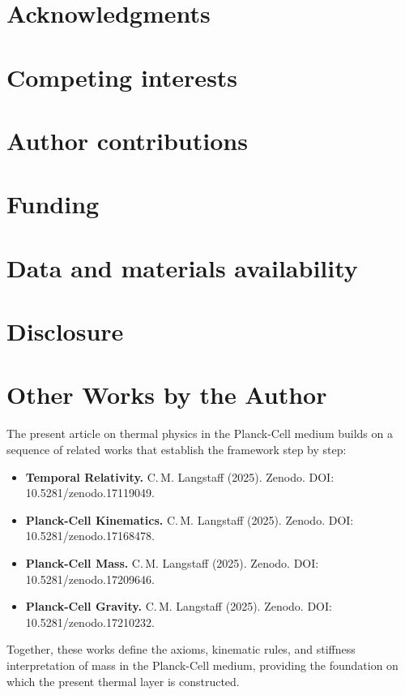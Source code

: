 \documentclass[11pt,oneside]{article}
\begin{document}
\clearpage
\section*{Acknowledgments}

\section*{Competing interests}

\section*{Author contributions}

\section*{Funding}

\section*{Data and materials availability}

\section*{Disclosure}

\clearpage
\section*{Other Works by the Author}
The present article on thermal physics in the Planck-Cell medium builds on a sequence
of related works that establish the framework step by step:
\begin{itemize}
  \item \textbf{Temporal Relativity.} C.\,M. Langstaff (2025). Zenodo. DOI: 10.5281/zenodo.17119049.
  \item \textbf{Planck-Cell Kinematics.} C.\,M. Langstaff (2025). Zenodo. DOI: 10.5281/zenodo.17168478.
  \item \textbf{Planck-Cell Mass.} C.\,M. Langstaff (2025). Zenodo. DOI: 10.5281/zenodo.17209646.
  \item \textbf{Planck-Cell Gravity.} C.\,M. Langstaff (2025). Zenodo. DOI: 10.5281/zenodo.17210232.
\end{itemize}
Together, these works define the axioms, kinematic rules, and stiffness
interpretation of mass in the Planck-Cell medium, providing the foundation
on which the present thermal layer is constructed.
\end{document}
